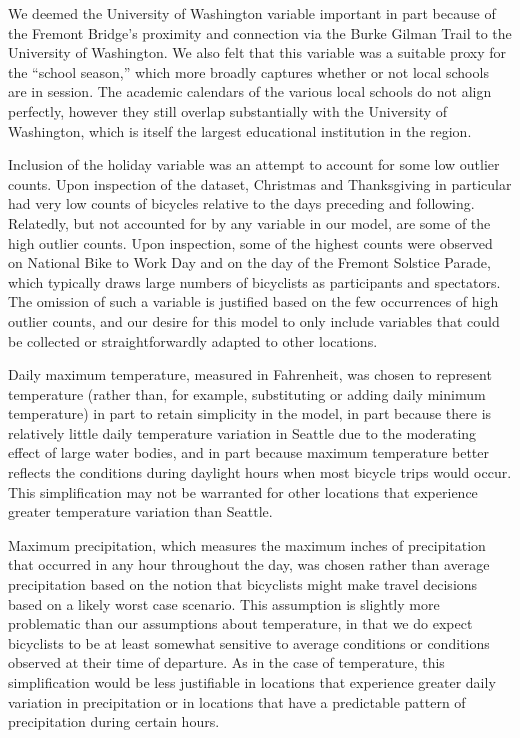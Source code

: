 \documentclass[12pt,letterpaper,article]{memoir} %
\begin{document}
We deemed the University of Washington variable important in part
because of the Fremont Bridge's proximity and connection via the Burke
Gilman Trail to the University of Washington. We also felt that this
variable was a suitable proxy for the ``school season,'' which more
broadly captures whether or not local schools are in session. The
academic calendars of the various local schools do not align
perfectly, however they still overlap substantially with the
University of Washington, which is itself the largest educational
institution in the region.

Inclusion of the holiday variable was an attempt to account for
some low outlier counts. Upon inspection of the dataset, Christmas and
Thanksgiving in particular had very low counts of bicycles relative to
the days preceding and following. Relatedly, but not accounted for by
any variable in our model, are some of the high outlier counts. Upon
inspection, some of the highest counts were observed on National Bike
to Work Day and on the day of the Fremont Solstice Parade, which
typically draws large numbers of bicyclists as participants and
spectators. The omission of such a variable is justified based on the
few occurrences of high outlier counts, and our desire for this model
to only include variables that could be collected or straightforwardly
adapted to other locations.

Daily maximum temperature, measured in Fahrenheit, was chosen to
represent temperature (rather than, for example, substituting or
adding daily minimum temperature) in part to retain simplicity in the
model, in part because there is relatively little daily temperature
variation in Seattle due to the moderating effect of large water
bodies, and in part because maximum temperature better reflects the
conditions during daylight hours when most bicycle trips would occur.
This simplification may not be warranted for other locations that
experience greater temperature variation than Seattle.

Maximum precipitation, which measures the maximum inches of
precipitation that occurred in any hour throughout the day, was chosen
rather than average precipitation based on the notion that bicyclists
might make travel decisions based on a likely worst case scenario.
This assumption is slightly more problematic than our assumptions
about temperature, in that we do expect bicyclists to be at least
somewhat sensitive to average conditions or conditions observed at
their time of departure. As in the case of temperature, this
simplification would be less justifiable in locations that experience
greater daily variation in precipitation or in locations that have a
predictable pattern of precipitation during certain hours.
\end{document}

